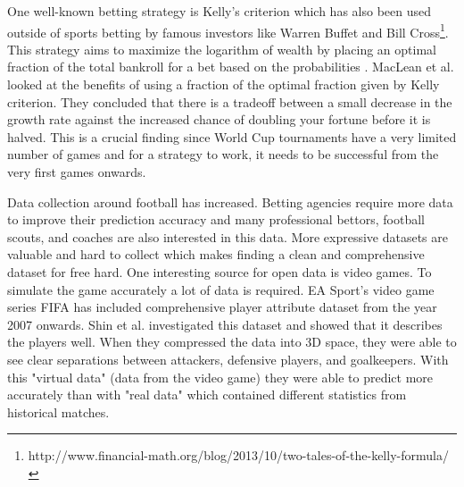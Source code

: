 One well-known betting strategy is Kelly's criterion which has also been used outside of sports betting by famous investors like Warren Buffet and Bill Cross\footnote{http://www.financial-math.org/blog/2013/10/two-tales-of-the-kelly-formula/}. This strategy aims to maximize the logarithm of wealth by placing an optimal fraction of the total bankroll for a bet based on the probabilities \cite{kelly2011new}. MacLean et al.\cite{maclean1992growth} looked at the benefits of using a fraction of the optimal fraction given by Kelly criterion. They concluded that there is a tradeoff between a small decrease in the growth rate against the increased chance of doubling your fortune before it is halved. This is a crucial finding since World Cup tournaments have a very limited number of games and for a strategy to work, it needs to be successful from the very first games onwards.

Data collection around football has increased. Betting agencies require more data to improve their prediction accuracy and many professional bettors, football scouts, and coaches are also interested in this data. More expressive datasets are valuable and hard to collect which makes finding a clean and comprehensive dataset for free hard. One interesting source for open data is video games. To simulate the game accurately a lot of data is required. EA Sport's video game series FIFA has included comprehensive player attribute dataset from the year 2007 onwards. Shin et al.\cite{shin2014novel} investigated this dataset and showed that it describes the players well. When they compressed the data into 3D space, they were able to see clear separations between attackers, defensive players, and goalkeepers. With this "virtual data" (data from the video game) they were able to predict more accurately than with "real data" which contained different statistics from historical matches.
